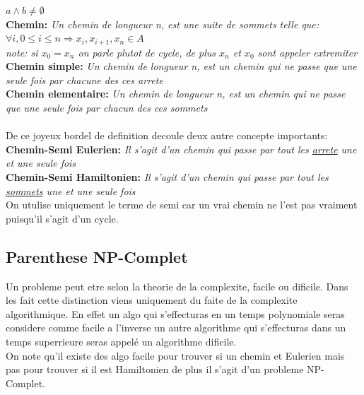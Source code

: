\documentclass[a4paper,11pt]{article}
\begin{document}
    $a \wedge b \neq \emptyset$\\
    \textbf{Chemin:}
    \emph{Un chemin de longueur n, est une suite de sommets telle que:}\\
    $\forall i, 0\leq i\leq n\Rightarrow x_i,x_{i+1},x_n\in A$
    \\\emph{note: si $x_0=x_n$ on parle plutot de cycle, de plus $x_n$ et $x_0$ sont appeler extremiter}\\
    \textbf{Chemin simple:}
    \emph{Un chemin de longueur n, est un chemin qui ne passe que une seule fois par chacune des ces arrete}\\
    \textbf{Chemin elementaire:}
    \emph{Un chemin de longueur n, est un chemin qui ne passe que une seule fois par chacun des ces sommets}\\
    \\De ce joyeux bordel de definition decoule deux autre concepte importants:
    \\
    \textbf{Chemin-Semi Eulerien:}
    \emph{Il s'agit d'un chemin qui passe par tout les \underline{arrete} une et une seule fois}\\
    \textbf{Chemin-Semi Hamiltonien:}
    \emph{Il s'agit d'un chemin qui passe par tout les \underline{sommets} une et une seule fois}\\
    On utulise uniquement le terme de semi car un vrai chemin ne l'est pas vraiment puisqu'il s'agit d'un cycle.
    \subsection{Parenthese NP-Complet}
      Un probleme peut etre selon la theorie de la complexite, facile ou dificile. Dans les fait cette distinction viens uniquement du faite de la complexite algorithmique. En effet un algo qui s'effecturas en un temps polynomiale seras considere comme facile a l'inverse un autre algorithme qui s'effecturas dans un temps superrieure seras appelé un algorithme dificile. \\On note qu'il existe des algo facile pour trouver si un chemin et Eulerien mais pas pour trouver si il est Hamiltonien de plus il s'agit d'un probleme NP-Complet.
\end{document}
